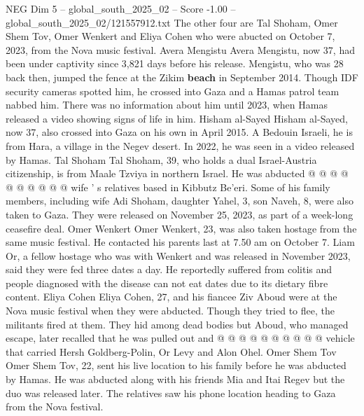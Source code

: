 \begin{textsample}{NEG Dim 5 – global\_south\_2025\_02 – Score -1.00 – global\_south\_2025\_02/121557912.txt}  \label{ex:f5_neg_245}
The other four are Tal Shoham, Omer Shem Tov, Omer Wenkert and Eliya Cohen who were abucted on October 7, 2023, from the Nova music festival.
Avera Mengistu Avera Mengistu, now 37, had been under captivity since 3,821 days before his release.
Mengistu, who was 28 back then, jumped the fence at the Zikim \textbf{beach} in September 2014.
Though IDF security cameras spotted him, he crossed into Gaza and a Hamas patrol team nabbed him.
There was no information about him until 2023, when Hamas released a video showing signs of life in him.
Hisham al-Sayed Hisham al-Sayed, now 37, also crossed into Gaza on his own in April 2015.
A Bedouin Israeli, he is from Hara, a village in the Negev desert.
In 2022, he was seen in a video released by Hamas.
Tal Shoham Tal Shoham, 39, who holds a dual Israel-Austria citizenship, is from Maale Tzviya in northern Israel.
He was abducted @ @ @ @ @ @ @ @ @ @ wife ' s relatives based in Kibbutz Be'eri.
Some of his family members, including wife Adi Shoham, daughter Yahel, 3, son Naveh, 8, were also taken to Gaza.
They were released on November 25, 2023, as part of a week-long ceasefire deal.
Omer Wenkert Omer Wenkert, 23, was also taken hostage from the same music festival.
He contacted his parents last at 7.50 am on October 7.
Liam Or, a fellow hostage who was with Wenkert and was released in November 2023, said they were fed three dates a day.
He reportedly suffered from colitis and people diagnosed with the disease can not eat dates due to its dietary fibre content.
Eliya Cohen Eliya Cohen, 27, and his fiancee Ziv Aboud were at the Nova music festival when they were abducted.
Though they tried to flee, the militants fired at them.
They hid among dead bodies but Aboud, who managed escape, later recalled that he was pulled out and @ @ @ @ @ @ @ @ @ @ vehicle that carried Hersh Goldberg-Polin, Or Levy and Alon Ohel.
Omer Shem Tov Omer Shem Tov, 22, sent his live location to his family before he was abducted by Hamas.
He was abducted along with his friends Mia and Itai Regev but the duo was released later.
The relatives saw his phone location heading to Gaza from the Nova festival.

\end{textsample}
